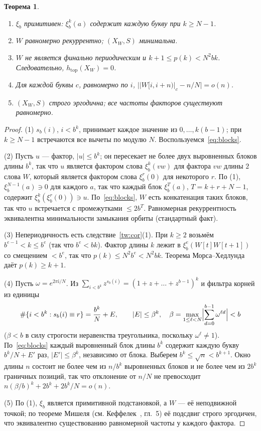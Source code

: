\documentclass[a4paper,14pt]{extreport}
\theoremstyle{plain}
\newtheorem{theorem}{Теорема}[section]
\theoremstyle{definition}
\theoremstyle{remark}
\begin{document}
\begin{theorem}\label{thm:dynWb}
	\begin{enumerate}
		\item[(1)] $\xi_b$ примитивен: $\xi_b^{k}(a)$ содержит каждую букву при $k\ge N-1$.
		\item[(2)] $W$ равномерно рекуррентно; $(X_W,S)$ минимальна.
		\item[(3)] $W$ не является финально периодическим и $k+1\le p(k)<N^2bk$. Следовательно, $h_{\mathrm{top}}(X_W)=0$.
		\item[(4)] Для каждой буквы $c$, равномерно по $i$, $\bigl||W[i,i+n)|_c-n/N\bigr|=o(n)$.
		\item[(5)] $(X_W,S)$ строго эргодична; все частоты факторов существуют равномерно.
	\end{enumerate}
\end{theorem}
\begin{proof}
	(1) $s_b(i)$, $i<b^k$, принимает каждое значение из $0,\dots,k(b-1)$; при $k\ge N-1$ встречаются все вычеты по модулю $N$.
	Воспользуемся~\eqref{eq:blocks}.
	
	(2) Пусть $u$ --- фактор, $|u|\le b^k$; он пересекает не более двух выровненных блоков длины $b^k$, так что $u$ является фактором слова $\xi_b^k(vw)$ для
	фактора $vw$ длины $2$ слова $W$, который является фактором слова $\xi_b^r(0)$ для некоторого $r$. По (1), $\xi_b^{N-1}(a)\ni0$ для каждого $a$,
	так что каждый блок $\xi_b^{T}(a)$, $T=k+r+N-1$, содержит $\xi_b^k(\xi_b^r(0))\ni u$. По~\eqref{eq:blocks}, $W$ есть конкатенация таких блоков,
	так что $u$ встречается с промежутками $\le2b^{T}$. Равномерная рекуррентность эквивалентна минимальности замыкания орбиты (стандартный факт).
	
	(3) Непериодичность есть следствие~\ref{tw:cor}(1). При $k\ge2$ возьмём $b^{e-1}<k\le b^e$ (так что $b^e<bk$). Фактор длины $k$ лежит в $\xi_b^e(W[t]W[t+1])$
	со смещением $<b^e$, так что $p(k)\le N^2b^e<N^2bk$. Теорема Морса--Хедлунда даёт $p(k)\ge k+1$.
	
	(4) Пусть $\omega=e^{2\pi\mathrm i/N}$. Из $\sum_{i<b^k}z^{s_b(i)}=(1+z+\dots+z^{b-1})^k$ и фильтра корней из единицы
	\begin{equation}
		\#\{i<b^k:s_b(i)\equiv r\}=\frac{b^k}N+E,\qquad |E|\le\beta^k,\quad
		\beta=\max_{1\le\ell<N}\Bigl|\sum_{d=0}^{b-1}\omega^{\ell d}\Bigr|<b
	\end{equation}
	($\beta<b$ в силу строгости неравенства треугольника, поскольку $\omega^\ell\ne1$). По~\eqref{eq:blocks} каждый выровненный блок длины $b^k$ содержит
	каждую букву $b^k/N+E'$ раз, $|E'|\le\beta^k$, независимо от блока. Выберем $b^k\le\sqrt n<b^{k+1}$.
	Окно длины $n$ состоит не более чем из $n/b^k$ выровненных блоков и не более чем из $2b^k$ граничных позиций, так что
	отклонение от $n/N$ не превосходит $n(\beta/b)^k+2b^k+2b^k/N=o(n)$.
	
	(5) По (1), $\xi_b$ является примитивной подстановкой, а $W$ --- её неподвижной точкой; по теореме Мишеля (см. Кеффелек~\cite{Queffelec}, гл.~5)
	её подсдвиг строго эргодичен, что эквивалентно существованию равномерной частоты у каждого фактора.
\end{proof}
\end{document}
